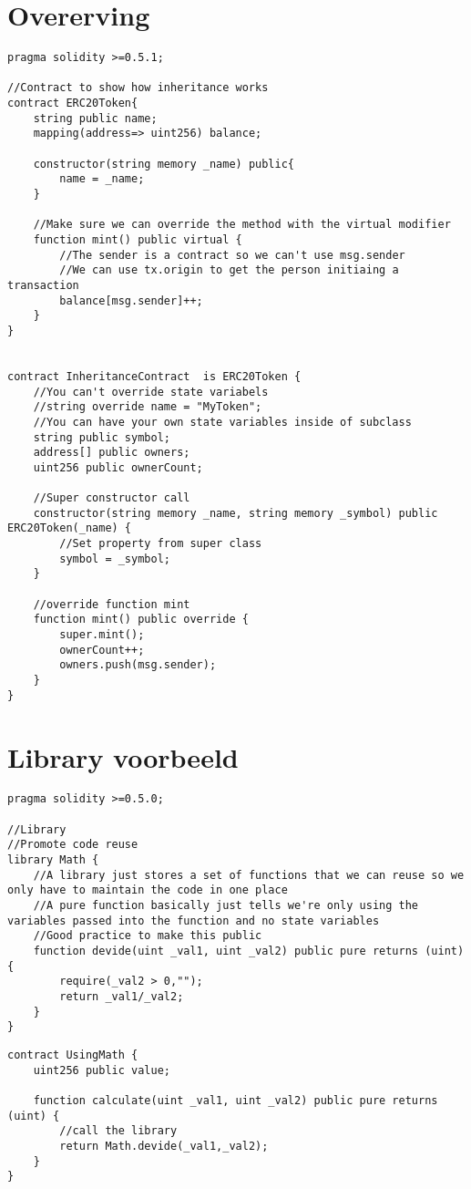 \section{Overerving}
\begin{lstlisting}[language=Solidity]
pragma solidity >=0.5.1;

//Contract to show how inheritance works
contract ERC20Token{
    string public name;
    mapping(address=> uint256) balance;

    constructor(string memory _name) public{
        name = _name;
    }

    //Make sure we can override the method with the virtual modifier
    function mint() public virtual {
        //The sender is a contract so we can't use msg.sender
        //We can use tx.origin to get the person initiaing a transaction
        balance[msg.sender]++;
    }
}


contract InheritanceContract  is ERC20Token {
    //You can't override state variabels
    //string override name = "MyToken";
    //You can have your own state variables inside of subclass
    string public symbol;
    address[] public owners;
    uint256 public ownerCount;

    //Super constructor call
    constructor(string memory _name, string memory _symbol) public ERC20Token(_name) {
        //Set property from super class
        symbol = _symbol;
    }

    //override function mint
    function mint() public override {
        super.mint();
        ownerCount++;
        owners.push(msg.sender);
    }
}
\end{lstlisting}
\section{Library voorbeeld}
\begin{lstlisting}[language=Solidity]
pragma solidity >=0.5.0;

//Library
//Promote code reuse
library Math {
    //A library just stores a set of functions that we can reuse so we only have to maintain the code in one place
    //A pure function basically just tells we're only using the variables passed into the function and no state variables
    //Good practice to make this public
    function devide(uint _val1, uint _val2) public pure returns (uint){
        require(_val2 > 0,"");
        return _val1/_val2;
    }
}
\end{lstlisting}
\begin{lstlisting}[language=Solidity]
contract UsingMath {
    uint256 public value;

    function calculate(uint _val1, uint _val2) public pure returns (uint) {
        //call the library
        return Math.devide(_val1,_val2);
    }
}
\end{lstlisting}
